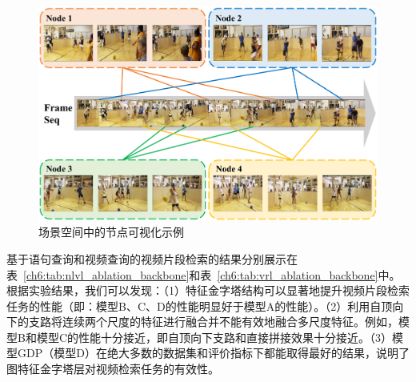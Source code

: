 \begin{figure}[t]
    \centering
    \includegraphics[width=0.9\linewidth]{chapter6/res/node_visualization.pdf}
    \caption{场景空间中的节点可视化示例}
    \label{ch6:fig:node_visualization}
\end{figure}

基于语句查询和视频查询的视频片段检索的结果分别展示在表~\ref{ch6:tab:nlvl_ablation_backbone}和表~\ref{ch6:tab:vrl_ablation_backbone}中。根据实验结果，我们可以发现：（1）特征金字塔结构可以显著地提升视频片段检索任务的性能（即：模型B、C、D的性能明显好于模型A的性能）。（2）利用自顶向下的支路将连续两个尺度的特征进行融合并不能有效地融合多尺度特征。例如，模型B和模型C的性能十分接近，即自顶向下支路和直接拼接效果十分接近。（3）模型GDP（模型D）在绝大多数的数据集和评价指标下都能取得最好的结果，说明了图特征金字塔层对视频检索任务的有效性。


